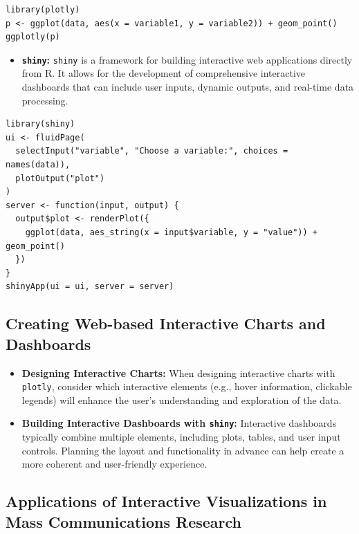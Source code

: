 \documentclass[
]{book}
\providecommand{\tightlist}{%
  \setlength{\itemsep}{0pt}\setlength{\parskip}{0pt}}
\begin{document}
\begin{verbatim}
library(plotly)
p <- ggplot(data, aes(x = variable1, y = variable2)) + geom_point()
ggplotly(p)
\end{verbatim}

\begin{itemize}
\tightlist
\item
  \textbf{\texttt{shiny}:} \texttt{shiny} is a framework for building interactive web applications directly from R. It allows for the development of comprehensive interactive dashboards that can include user inputs, dynamic outputs, and real-time data processing.
\end{itemize}

\begin{verbatim}
library(shiny)
ui <- fluidPage(
  selectInput("variable", "Choose a variable:", choices = names(data)),
  plotOutput("plot")
)
server <- function(input, output) {
  output$plot <- renderPlot({
    ggplot(data, aes_string(x = input$variable, y = "value")) + geom_point()
  })
}
shinyApp(ui = ui, server = server)
\end{verbatim}

\subsection{Creating Web-based Interactive Charts and Dashboards}\label{creating-web-based-interactive-charts-and-dashboards}

\begin{itemize}
\item
  \textbf{Designing Interactive Charts:} When designing interactive charts with \texttt{plotly}, consider which interactive elements (e.g., hover information, clickable legends) will enhance the user's understanding and exploration of the data.
\item
  \textbf{Building Interactive Dashboards with \texttt{shiny}:} Interactive dashboards typically combine multiple elements, including plots, tables, and user input controls. Planning the layout and functionality in advance can help create a more coherent and user-friendly experience.
\end{itemize}

\subsection{Applications of Interactive Visualizations in Mass Communications Research}\label{applications-of-interactive-visualizations-in-mass-communications-research}
\end{document}

